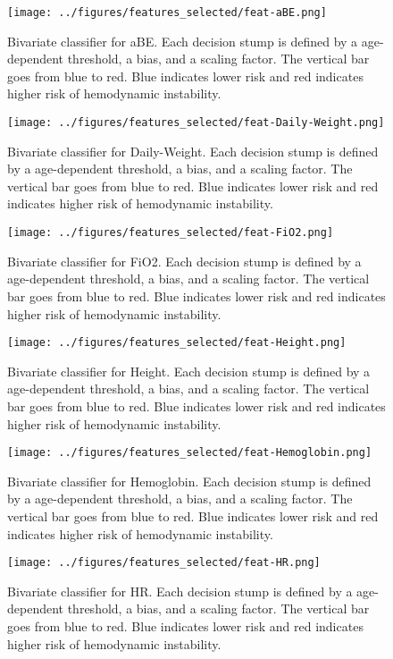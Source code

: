 \documentclass[
   technote
]{phildoc}
\begin{document}
\begin{figure}[h!]
	\centering
	\texttt{[image: ../figures/features\_selected/feat-aBE.png]}
	\caption{Bivariate classifier for aBE. Each decision stump is defined by a age-dependent threshold, a bias, and a scaling factor. The vertical bar goes from blue to red. Blue indicates lower risk and red indicates higher risk of hemodynamic instability.}      
\end{figure}

\begin{figure}[h!]
	\centering
	\texttt{[image: ../figures/features\_selected/feat-Daily-Weight.png]}
	\caption{Bivariate classifier for Daily-Weight. Each decision stump is defined by a age-dependent threshold, a bias, and a scaling factor. The vertical bar goes from blue to red. Blue indicates lower risk and red indicates higher risk of hemodynamic instability.}      
\end{figure}

\clearpage

\begin{figure}[h!]
	\centering
	\texttt{[image: ../figures/features\_selected/feat-FiO2.png]}
	\caption{Bivariate classifier for FiO2. Each decision stump is defined by a age-dependent threshold, a bias, and a scaling factor. The vertical bar goes from blue to red. Blue indicates lower risk and red indicates higher risk of hemodynamic instability.}      
\end{figure}

\begin{figure}[h!]
	\centering
	\texttt{[image: ../figures/features\_selected/feat-Height.png]}
	\caption{Bivariate classifier for Height. Each decision stump is defined by a age-dependent threshold, a bias, and a scaling factor. The vertical bar goes from blue to red. Blue indicates lower risk and red indicates higher risk of hemodynamic instability.}      
\end{figure}

\begin{figure}[h!]
	\centering
	\texttt{[image: ../figures/features\_selected/feat-Hemoglobin.png]}
	\caption{Bivariate classifier for Hemoglobin. Each decision stump is defined by a age-dependent threshold, a bias, and a scaling factor. The vertical bar goes from blue to red. Blue indicates lower risk and red indicates higher risk of hemodynamic instability.}      
\end{figure}

\begin{figure}[h!]
	\centering
	\texttt{[image: ../figures/features\_selected/feat-HR.png]}
	\caption{Bivariate classifier for HR. Each decision stump is defined by a age-dependent threshold, a bias, and a scaling factor. The vertical bar goes from blue to red. Blue indicates lower risk and red indicates higher risk of hemodynamic instability.}      
\end{figure}
\end{document}
